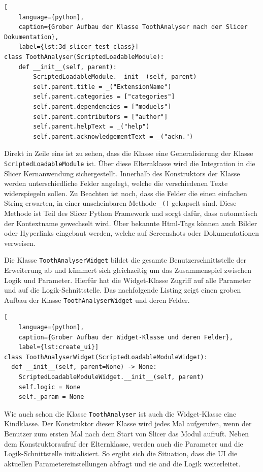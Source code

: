 \begin{lstlisting}[
    language={python},
    caption={Grober Aufbau der Klasse ToothAnalyser nach der Slicer Dokumentation},
    label={lst:3d_slicer_test_class}]
class ToothAnalyser(ScriptedLoadableModule):
    def __init__(self, parent):
	    ScriptedLoadableModule.__init__(self, parent)
	    self.parent.title = _("ExtensionName")
	    self.parent.categories = ["categories"]
	    self.parent.dependencies = ["moduels"]
	    self.parent.contributors = ["author"]
	    self.parent.helpText = _("help")
	    self.parent.acknowledgementText = _("ackn.")
\end{lstlisting}

Direkt in Zeile eins ist zu sehen, dass die Klasse eine Generalisierung der Klasse
\texttt{ScriptedLoadableModule} ist. Über diese Elternklasse wird die Integration
in die Slicer Kernanwendung sichergestellt. Innerhalb des Konstruktors der
Klasse werden unterschiedliche Felder angelegt, welche die verschiedenen Texte widerspiegeln
sollen. Zu Beachten ist noch, dass die Felder die einen einfachen String erwarten,
in einer unscheinbaren Methode \texttt{\_()} gekapselt sind. Diese Methode ist
Teil des Slicer Python Framework und sorgt dafür, dass automatisch der Kontextname
gewechselt wird. Über bekannte Html-Tags können auch Bilder oder Hyperlinks
eingebaut werden, welche auf Screenshots oder Dokumentationen verweisen.

Die Klasse \texttt{ToothAnalyserWidget} bildet die gesamte Benutzerschnittstelle
der Erweiterung ab und kümmert sich gleichzeitig um das Zusammenspiel zwischen
Logik und Parameter. Hierfür hat die Widget-Klasse Zugriff auf alle Parameter und
auf die Logik-Schnittstelle. Das nachfolgende Listing zeigt einen groben Aufbau
der Klasse \texttt{ToothAnalyserWidget} und deren Felder.

\begin{lstlisting}[
    language={python},
    caption={Grober Aufbau der Widget-Klasse und deren Felder},
    label={lst:create_ui}]
class ToothAnalyserWidget(ScriptedLoadableModuleWidget):
  def __init__(self, parent=None) -> None:
    ScriptedLoadableModuleWidget.__init__(self, parent)
    self.logic = None
    self._param = None
\end{lstlisting}

Wie auch schon die Klasse \texttt{ToothAnalyser} ist auch die Widget-Klasse eine
Kindklasse. Der Konstruktor dieser Klasse wird jedes Mal aufgerufen, wenn der Benutzer
zum ersten Mal nach dem Start von Slicer das Modul aufruft. Neben dem
Konstruktoraufruf der Elternklasse, werden auch die Parameter und die Logik-Schnittstelle
initialisiert. So ergibt sich die Situation, dass die UI die aktuellen Parametereinstellungen
abfragt und sie and die Logik weiterleitet.

